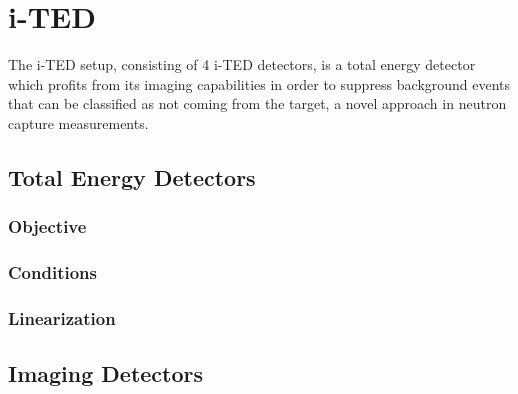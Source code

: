 \chapter{i-TED}\label{ch:detector}

The i-TED setup, consisting of 4 i-TED detectors, is a total energy detector which profits from its imaging capabilities in order to suppress background events that can be classified as not coming from the target, a novel approach in neutron capture measurements.

\section{Total Energy Detectors}

\subsection{Objective}

\subsection{Conditions}

\subsection{Linearization}

\section{Imaging Detectors}

